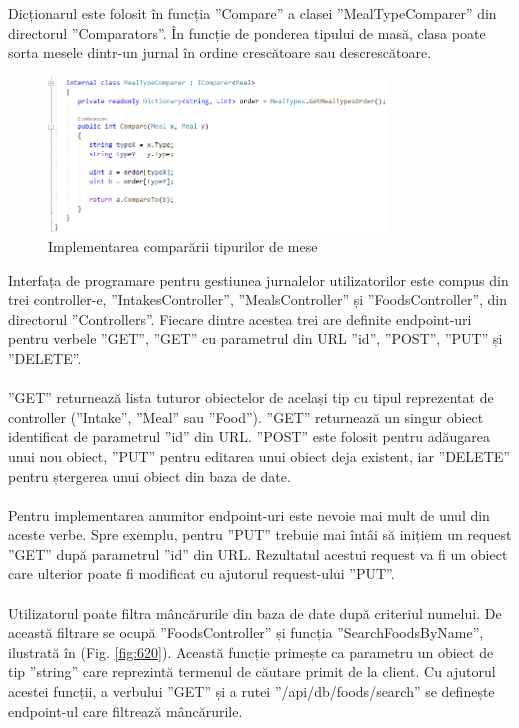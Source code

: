 Dicționarul este folosit în funcția ”Compare” a clasei ”MealTypeComparer” din directorul ”Comparators”. În funcție de ponderea tipului de masă, clasa poate sorta mesele dintr-un jurnal în ordine crescătoare sau descrescătoare.

\begin{figure}[!htb]
	\centering
	\includegraphics[width=0.8\textwidth]
	{../LaTeX/Images/fsapi_mealtypecomparer.PNG}
	\caption{Implementarea comparării tipurilor de mese}
	\label{fig:619}
\end{figure}

Interfața de programare pentru gestiunea jurnalelor utilizatorilor este compus din trei controller-e, ”IntakesController”, ”MealsController” și ”FoodsController”, din directorul ”Controllers”. Fiecare dintre acestea trei are definite endpoint-uri pentru verbele ”GET”, ”GET” cu parametrul din URL ”id”, ”POST”, ”PUT” și ”DELETE”.
\\ \\
”GET” returnează lista tuturor obiectelor de același tip cu tipul reprezentat de controller (”Intake”, ”Meal” sau ”Food”). ”GET” returnează un singur obiect identificat de parametrul ”id” din URL. ”POST” este folosit pentru adăugarea unui nou obiect, ”PUT” pentru editarea unui obiect deja existent, iar ”DELETE” pentru ștergerea unui obiect din baza de date.
\\ \\
Pentru implementarea anumitor endpoint-uri este nevoie mai mult de unul din aceste verbe. Spre exemplu, pentru ”PUT” trebuie mai întâi să inițiem un request ”GET” după parametrul ”id” din URL. Rezultatul acestui request va fi un obiect care ulterior poate fi modificat cu ajutorul request-ului ”PUT”.
\\ \\
Utilizatorul poate filtra mâncărurile din baza de date după criteriul numelui. De această filtrare se ocupă ”FoodsController” și funcția ”SearchFoodsByName”, ilustrată în (Fig. \ref{fig:620}). Această funcție primește ca parametru un obiect de tip ”string” care reprezintă termenul de căutare primit de la client. Cu ajutorul acestei funcții, a verbului ”GET” și a rutei ”/api/db/foods/search” se definește endpoint-ul care filtrează mâncărurile.

